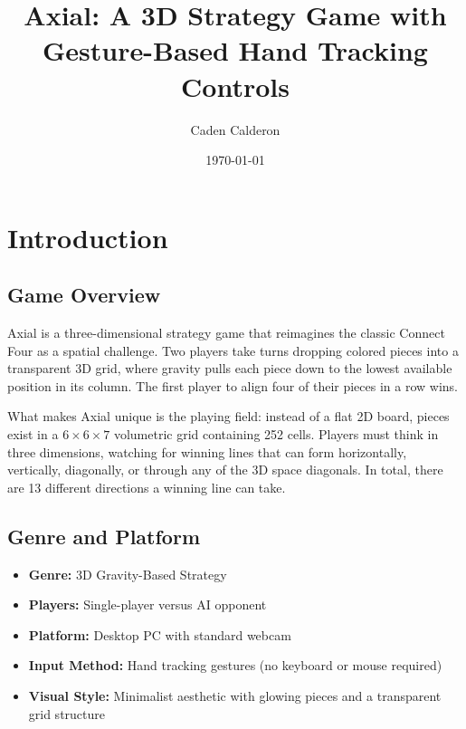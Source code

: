 \documentclass[11pt]{article}
\title{\textbf{Axial: A 3D Strategy Game with \\Gesture-Based Hand Tracking Controls}}
\author{Caden Calderon}
\date{\today}
\begin{document}
\maketitle

\section{Introduction}

\subsection{Game Overview}

Axial is a three-dimensional strategy game that reimagines the classic Connect Four as a spatial challenge. Two players take turns dropping colored pieces into a transparent 3D grid, where gravity pulls each piece down to the lowest available position in its column. The first player to align four of their pieces in a row wins.

What makes Axial unique is the playing field: instead of a flat 2D board, pieces exist in a $6 \times 6 \times 7$ volumetric grid containing 252 cells. Players must think in three dimensions, watching for winning lines that can form horizontally, vertically, diagonally, or through any of the 3D space diagonals. In total, there are 13 different directions a winning line can take.


\subsection{Genre and Platform}

\begin{itemize}
    \item \textbf{Genre:} 3D Gravity-Based Strategy
    \item \textbf{Players:} Single-player versus AI opponent
    \item \textbf{Platform:} Desktop PC with standard webcam
    \item \textbf{Input Method:} Hand tracking gestures (no keyboard or mouse required)
    \item \textbf{Visual Style:} Minimalist aesthetic with glowing pieces and a transparent grid structure
\end{itemize}
\end{document}

